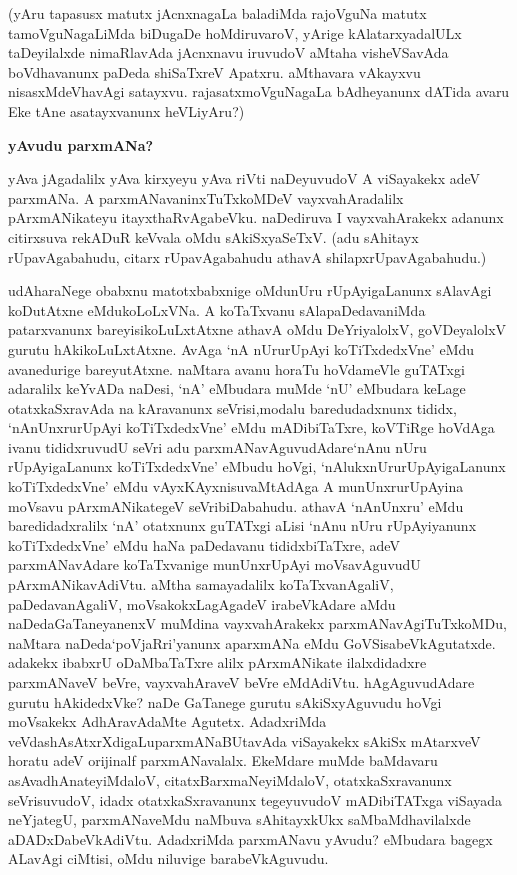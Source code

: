 \noindent
(yAru tapasusx matutx jAcnxnagaLa baladiMda rajoVguNa matutx tamoVguNagaLiMda biDugaDe hoMdi\-ruvaroV, yArige kAlatarxyadalULx taDeyilalxde nimaRlavAda jAcnxnavu iruvudoV aMtaha visheVSa\-vAda boVdhavanunx paDeda shiSaTxreV Apatxru. aMthavara vAkayxvu nisasxMdeVhavAgi satayxvu. rajasatxmoVguNa\-gaLa bAdheyanunx dATida avaru Eke tAne asatayxvanunx heVLiyAru?)

{\bigskip
\noindent
{\large\bf yAvudu parxmANa?}}\label{page134}
\medskip

\noindent
yAva jAgadalilx yAva kirxyeyu yAva riVti naDeyuvudoV A viSayakekx adeV parxmANa. A parxmANavaninxTuTxkoMDeV vayxvahAradalilx pArxmANikateyu itayxthaRvAgabeVku. naDediruva I vayxva\-hArakekx adanunx citirxsuva rekADuR keVvala oMdu sAkiSxyaSeTxV. (adu sAhitayx rUpavAgabahudu, citarx rUpavAgabahudu athavA shilapxrUpavAgabahudu.)

udAharaNege obabxnu matotxbabxnige oMdunUru rUpAyigaLanunx sAlavAgi koDutAtxne eMdu\-koLoLxVNa. A koTaTxvanu sAlapaDedavaniMda patarxvanunx bareyisi\-koLuLxtAtxne athavA oMdu DeYri\-yalolxV, goVDeyalolxV gurutu hAkikoLuLxtAtxne. AvAga `nA nUrurUpAyi koTiTxdedxVne' eMdu avanedu\-rige bareyutAtxne. naMtara avanu horaTu hoVdameVle guTATxgi adaralilx keYvADa naDesi, `nA' eMbu\-dara muMde `nU' eMbudara keLage otatxkaSxravAda na kAravanunx seVrisi,\break modalu baredudadxnunx tididx, `nAnUnxru\-rUpAyi koTiTxdedxVne' eMdu mADi\-biTaTxre, koVTiRge hoVdAga ivanu tididxruvudU seVri adu parxmANa\-vAguvudAdare\break `nAnu nUru rUpAyigaLanunx koTiTxdedxVne' eMbudu hoVgi, `nAlukx\-nUru\break rUpAyigaLanunx koTiTxdedxVne' eMdu vAyxKAyxnisuvaMtAdAga A munUnxru\break rUpAyina moVsavu pArxmA\-NikategeV seVribiDabahudu. athavA `nAnUnxru' eMdu baredidadxralilx `nA' otatxnunx guTATxgi aLisi `nAnu nUru rUpAyiyanunx koTiTxdedxVne' eMdu haNa paDedavanu tididxbiTaTxre, adeV parxmANavAdare koTaTxvanige munUnxrUpAyi moVsavAguvudU pArxmANikavAdiVtu. aMtha samayadalilx koTaTxva\-nAgaliV, paDedavanAgaliV, moVsakokxLagAgadeV irabeVkAdare aMdu naDeda\break GaTaneyanenxV muMdina vayxvahArakekx parxmANavAgiTuTxkoMDu, naMtara naDeda\break `poVjaRri'yanunx aparxmANa eMdu GoVSisa\-beVkAgutatxde. adakekx ibabxrU oDaM\-baTaTxre alilx pArxmANikate ilalxdidadxre parxmANaveV beVre, vayxvahAraveV beVre eMdA\-diVtu. hAgAguvudAdare gurutu hAkidedxVke? naDe GaTanege gurutu sAkiSx\-yAgu\-vudu hoVgi moVsakekx AdhAravAdaMte Agutetx. AdadxriMda veVdashAsAtxrXdigaLu\break parxmANa\-BUtavAda viSayakekx sAkiSx mAtarxveV horatu adeV orijinalf parxmANa\-valalx. EkeMdare muMde baMdavaru asAvadhAnate\-yiMdaloV, citatxBarxmaNe\break\-yiMdaloV, otatxkaSxravanunx seVrisuvudoV, idadx otatxkaSxravanunx tegeyuvudoV mADi\-biTATxga viSayada neYjategU, parxmANaveMdu naMbuva sAhitayxkUkx saMbaMdhavilalxde aDADxDabeVkA\-diVtu. AdadxriMda parxmANavu yAvudu? eMbudara bagegx ALavAgi ciMtisi, oMdu niluvige barabeVkA\-guvudu.

